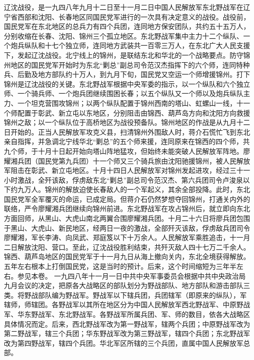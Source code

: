 \begin{maonote}
辽沈战役，是一九四八年九月十二日至十一月二日中国人民解放军东北野战军在辽宁省西部和沈阳、长春地区同国民党军进行的一次具有决定意义的战役。战役前，国民党军在东北地区的总兵力有四个兵团，连同地方保安团队，共约五十五万人，分别收缩在长春、沈阳、锦州三个孤立地区。东北野战军集中主力十二个纵队、一个炮兵纵队和十七个独立师，连同地方武装共一百零三万人，在东北广大人民支援下，发起辽沈战役。北宁线上的锦州，是联结东北和华北的一个战略要点。防守锦州地区的国民党军开始时为东北“剿总”副总司令范汉杰指挥下的六个师，连同特种兵、后勤及地方部队约十万人，到九月下旬，国民党又空运一个师增援锦州。打下锦州是辽沈战役的关键。东北野战军根据中央军委的指示，以一个纵队和六个独立师、一个骑兵师、一个炮兵团继续围困长春；以五个纵队又一个师以及炮兵纵队主力、一个坦克营围攻锦州；以两个纵队配置于锦州西南的塔山、虹螺山一线，十一个师配置于彰武、新立屯以东地区，分别阻击由锦西、葫芦岛方向和沈阳方向救援锦州之敌；以一个纵队位于高桥地区为战役预备队。锦州地区的作战是从九月十二日开始的。正当人民解放军攻克义县，扫清锦州外围敌人时，蒋介石慌忙飞到东北亲自指挥，并急调北宁线华北“剿总”的五个师来援，连同原来在锦西的四个师，共九个师，于十月十日起开始向塔山阵地猛攻，但始终未能突破人民解放军阵地。廖耀湘兵团（国民党第九兵团）十一个师又三个骑兵旅由沈阳驰援锦州，被人民解放军阻击在彰武、新立屯地区。十月十四日人民解放军对锦州发起进攻，经过三十一小时激战，全歼该敌，俘虏敌东北“剿总”副总司令范汉杰、第六兵团司令卢浚泉以下约九万人。锦州的解放迫使长春敌人的一个军起义，其余全部投降。此时，东北国民党军全军覆灭的命运，已成定局。但蒋介石仍然梦想夺回锦州，打通关内外的联络，严令廖耀湘兵团继续向锦州前进。东北野战军在攻占锦州后，就立即向东北方面回师，从黑山、大虎山南北两翼合围廖耀湘兵团。十月二十六日将廖兵团包围于黑山、大虎山、新民地区，经两日一夜的激战，全部歼灭该敌，俘虏敌兵团司令廖耀湘，军长李涛、向凤武、郑庭笈以下十万余人。人民解放军乘胜追击，十一月二日解放沈阳、营口。至此，辽沈战役胜利结束，共歼灭敌人四十七万二千余人。锦西、葫芦岛地区的国民党军于十一月九日从海上撤向关内，东北全境获得解放。
五年左右根本上打倒国民党，这是当时的预计。后来，这个时间缩短为三年半左右。参见本卷。
一九四八年十一月一日中共中央军事委员会根据中共中央政治局九月会议的决定，把原各大战略区的部队划分为野战部队、地方部队和游击部队三类。将野战部队编为野战军。野战军以下辖兵团，兵团辖军（即原来的纵队），军辖师，师辖团。各野战军以其所在地区分为中国人民解放军西北野战军、中原野战军、华东野战军、东北野战军。各野战军所属兵团、军、师的数目，依各大战略区具体情况而定。后来，西北野战军改为第一野战军，辖两个兵团；中原野战军改为第二野战军，辖三个兵团；华东野战军改为第三野战军，辖四个兵团；东北野战军改为第四野战军，辖四个兵团。华北军区所辖的三个兵团，直属中国人民解放军总部。
\end{maonote}

